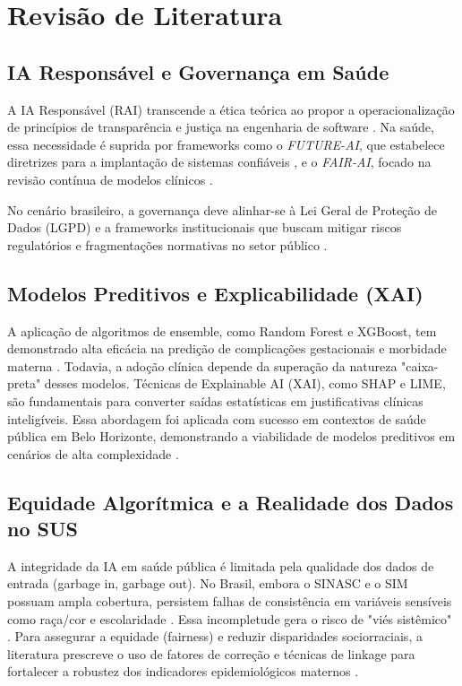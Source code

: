 \documentclass[12pt]{article}
\begin{document}
\section{Revisão de Literatura}

\subsection{IA Responsável e Governança em Saúde}
A IA Responsável (RAI) transcende a ética teórica ao propor a operacionalização de princípios de transparência e justiça na engenharia de software \cite{Shneiderman2021, Dignum2022}. Na saúde, essa necessidade é suprida por frameworks como o \textit{FUTURE-AI}, que estabelece diretrizes para a implantação de sistemas confiáveis \cite{Lekadir2023}, e o \textit{FAIR-AI}, focado na revisão contínua de modelos clínicos \cite{Lekadir2022}.

No cenário brasileiro, a governança deve alinhar-se à Lei Geral de Proteção de Dados (LGPD) e a frameworks institucionais que buscam mitigar riscos regulatórios e fragmentações normativas no setor público \cite{Atheniense2024, FrameworkGovBR2025}.

\subsection{Modelos Preditivos e Explicabilidade (XAI)}
A aplicação de algoritmos de ensemble, como Random Forest e XGBoost, tem demonstrado alta eficácia na predição de complicações gestacionais e morbidade materna \cite{MachineLearning2022, Cetin2020}. Todavia, a adoção clínica depende da superação da natureza "caixa-preta" desses modelos. Técnicas de Explainable AI (XAI), como SHAP e LIME, são fundamentais para converter saídas estatísticas em justificativas clínicas inteligíveis\cite{Advancing2025, ExplainableAI2023}. Essa abordagem foi aplicada com sucesso em contextos de saúde pública em Belo Horizonte, demonstrando a viabilidade de modelos preditivos em cenários de alta complexidade \cite{Dias2024}.

\subsection{Equidade Algorítmica e a Realidade dos Dados no SUS}
A integridade da IA em saúde pública é limitada pela qualidade dos dados de entrada (garbage in, garbage out). No Brasil, embora o SINASC e o SIM possuam ampla cobertura, persistem falhas de consistência em variáveis sensíveis como raça/cor e escolaridade \cite{Santos2021}. Essa incompletude gera o risco de "viés sistêmico" \cite{ViesAlgoritmico2024, FairnessAI2023}. Para assegurar a equidade (fairness) e reduzir disparidades sociorraciais, a literatura prescreve o uso de fatores de correção e técnicas de linkage para fortalecer a robustez dos indicadores epidemiológicos maternos \cite{Laurenti2010, Carvalho2019}.
\end{document}
